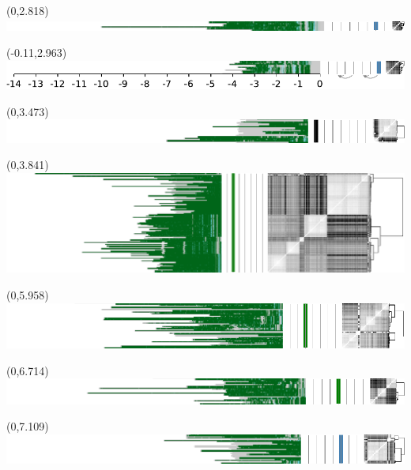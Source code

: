 \documentclass{article}
\begin{document}
\begin{textblock}{13}(0,2.818)\includegraphics{./Figure_S4/3ptel_1-500K_1_12_12-HG006.pdf}\end{textblock}
\begin{textblock}{13}(-0.11,2.963)\includegraphics{./Figure_S4/3ptel_1-500K_1_12_12-HG007.pdf}\end{textblock}
\begin{textblock}{13}(0,3.473)\includegraphics{./Figure_S4/4ptel_1-500K_1_12_12-HG001.pdf}\end{textblock}
\begin{textblock}{13}(0,3.841)\includegraphics{./Figure_S4/4ptel_1-500K_1_12_12-HG002.pdf}\end{textblock}
\begin{textblock}{13}(0,5.958)\includegraphics{./Figure_S4/4ptel_1-500K_1_12_12-HG003.pdf}\end{textblock}
\begin{textblock}{13}(0,6.714)\includegraphics{./Figure_S4/4ptel_1-500K_1_12_12-HG004.pdf}\end{textblock}
\begin{textblock}{13}(0,7.109)\includegraphics{./Figure_S4/4ptel_1-500K_1_12_12-HG005.pdf}\end{textblock}
\end{document}
